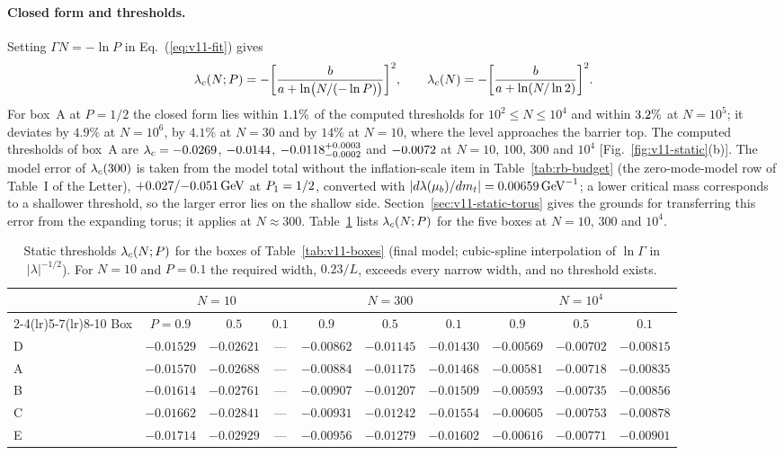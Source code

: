 \paragraph{Closed form and thresholds.}
Setting $\Gamma N=-\ln P$ in Eq.~(\ref{eq:v11-fit}) gives
\begin{equation}
\lambda_c(N;P)=-\biggl[\frac{b}{a+\ln\bigl(N/(-\ln P)\bigr)}\biggr]^2,\qquad
\lambda_c(N)=-\biggl[\frac{b}{a+\ln(N/\ln2)}\biggr]^2 .
\label{eq:v11-closed}
\end{equation}
For box~A at $P=1/2$ the closed form lies within $1.1\%$ of the computed thresholds for $10^2\le N\le10^4$ and within $3.2\%$ at $N=10^5$; it deviates by $4.9\%$ at $N=10^6$, by $4.1\%$ at $N=30$ and by $14\%$ at $N=10$, where the level approaches the barrier top. %
The computed thresholds of box~A are $\lambda_c=-0.0269$, $-0.0144$, $-0.0118^{+0.0003}_{-0.0002}$ and $-0.0072$ at $N=10$, $100$, $300$ and $10^4$ [Fig.~\ref{fig:v11-static}(b)]. %
The model error of $\lambda_c(300)$ is taken from the model total without the inflation-scale item in Table~\ref{tab:rb-budget} (the zero-mode-model row of Table~I of the Letter), $+0.027/{-0.051}\,\mathrm{GeV}$ at $P_1=1/2$, converted with $|d\lambda(\mu_b)/dm_t|=0.00659\,\mathrm{GeV}^{-1}$; a lower critical mass corresponds to a shallower threshold, so the larger error lies on the shallow side. %
Section~\ref{sec:v11-static-torus} gives the grounds for transferring this error from the expanding torus; it applies at $N\approx300$.
Table~\ref{tab:v11-lamc} lists $\lambda_c(N;P)$ for the five boxes at $N=10$, $300$ and $10^4$.

\begin{table}[t]
\centering
\caption{Static thresholds $\lambda_c(N;P)$ for the boxes of Table~\ref{tab:v11-boxes} (final model; cubic-spline interpolation of $\ln\Gamma$ in $|\lambda|^{-1/2}$). For $N=10$ and $P=0.1$ the required width, $0.23/L$, exceeds every narrow width, and no threshold exists.} %
\label{tab:v11-lamc}
\small
\setlength{\tabcolsep}{4pt}
\begin{tabular}{lccccccccc}
\toprule
 & \multicolumn{3}{c}{$N=10$} & \multicolumn{3}{c}{$N=300$} & \multicolumn{3}{c}{$N=10^4$} \\
\cmidrule(lr){2-4}\cmidrule(lr){5-7}\cmidrule(lr){8-10}
Box & $P=0.9$ & $0.5$ & $0.1$ & $0.9$ & $0.5$ & $0.1$ & $0.9$ & $0.5$ & $0.1$ \\
\midrule
D & $-0.01529$ & $-0.02621$ & --- & $-0.00862$ & $-0.01145$ & $-0.01430$ & $-0.00569$ & $-0.00702$ & $-0.00815$ \\ %
A & $-0.01570$ & $-0.02688$ & --- & $-0.00884$ & $-0.01175$ & $-0.01468$ & $-0.00581$ & $-0.00718$ & $-0.00835$ \\ %
B & $-0.01614$ & $-0.02761$ & --- & $-0.00907$ & $-0.01207$ & $-0.01509$ & $-0.00593$ & $-0.00735$ & $-0.00856$ \\ %
C & $-0.01662$ & $-0.02841$ & --- & $-0.00931$ & $-0.01242$ & $-0.01554$ & $-0.00605$ & $-0.00753$ & $-0.00878$ \\ %
E & $-0.01714$ & $-0.02929$ & --- & $-0.00956$ & $-0.01279$ & $-0.01602$ & $-0.00616$ & $-0.00771$ & $-0.00901$ \\ %
\bottomrule
\end{tabular}
\end{table}

